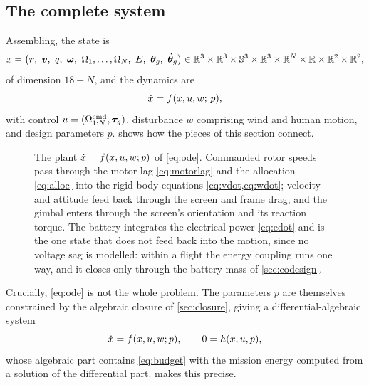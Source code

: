 \subsection{The complete system}

Assembling, the state is
\begin{equation}
  x = \big(\bm{r},\ \bm{v},\ q,\ \bm{\omega},\
        \Omega_1,\dots,\Omega_N,\ E,\
        \bm{\theta}_g,\ \dot{\bm{\theta}}_g\big)
  \in \mathbb{R}^{3}\times\mathbb{R}^{3}\times\mathbb{S}^{3}\times\mathbb{R}^{3}\times\mathbb{R}^{N}\times\mathbb{R}
      \times\mathbb{R}^{2}\times\mathbb{R}^{2} ,
  \label{eq:state}
\end{equation}
of dimension $18+N$, and the dynamics are
\begin{equation}
  \dot{x} = f(x,u,w;\,p),
  \label{eq:ode}
\end{equation}
with control $u = (\Omega^{\mathrm{cmd}}_{1:N}, \bm{\tau}_g)$, disturbance $w$
comprising wind and human motion, and design parameters $p$.
\Cref{fig:plant} shows how the pieces of this section connect.

\begin{figure}[tbp]
\centering

\caption{The plant $\dot{x}=f(x,u,w;p)$ of \cref{eq:ode}. Commanded rotor speeds
pass through the motor lag \cref{eq:motorlag} and the allocation \cref{eq:alloc}
into the rigid-body equations \cref{eq:vdot,eq:wdot}; velocity and attitude feed
back through the screen and frame drag, and the gimbal enters through the
screen's orientation and its reaction torque. The battery integrates the
electrical power \cref{eq:edot} and is the one state that does not feed back
into the motion, since no voltage sag is modelled: within a flight the energy
coupling runs one way, and it closes only through the battery mass of
\cref{sec:codesign}.}
\label{fig:plant}
\end{figure}

Crucially, \cref{eq:ode} is not the whole problem. The parameters $p$ are
themselves constrained by the algebraic closure of \cref{sec:closure}, giving a
differential-algebraic system
\begin{equation}
  \dot{x} = f(x,u,w;p),
  \qquad
  0 = h(x,u,p) ,
  \label{eq:dae}
\end{equation}
whose algebraic part contains \cref{eq:budget} with the mission energy computed
from a solution of the differential part.  makes this
precise.
